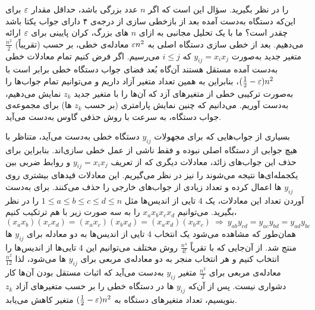را در نظر بگیرید. سؤال این است که اگر 
$n$
عدد بزرگی باشد، حداقل مقدار 
$\varepsilon$
برای این‌که دستگاه به‌دست آمده بعد از بازخطی سازی  از درجه‌ی ۴ دارای جواب یکتا باشد چقدر است؟ ما با یک تحلیل مجانبی به ازای 
$n$
های بزرگ، کران پایینی برای 
$\varepsilon$
ارائه می‌دهیم. بعد از خطی سازی دستگاه اصلی به 
$\varepsilon n^{2}$
معادله‌ی خطی، بر حسب  (تقریباً) 
$\frac{n^{2}}{2}$
متغیر جدید به‌صورت 
$y_{ij} = x_{i}x_{j}$
که 
$i\leq j$
می‌رسیم. اگر فرض کنیم تمام معادلات خطی به‌دست  آمده مستقل هستند آن‌گاه بُعد فضای جواب دستگاه خطی برابر است با 
$(\frac{1}{2} - \varepsilon)n^{2}$، 
بنابراین به همین تعداد متغیر آزاد داریم و می‌توانیم تمام جواب‌ها را به‌صورت ترکیبی خطی از متغیرهای آزد که آن‌ها را با متغیر جدید 
$z_{k}$
نمایش می‌دهیم، به‌دست  آوریم. می‌دانیم که چنین نمایش پارامتری (بر حسب 
$z_{k}$
ها) برای مجموعه‌ی جواب دستگاه، به‌ سرعت با روش حذفی گاوس به‌دست  می‌آید.

بسیاری از جواب‌هایی که برای مجهولات 
$y_{ij}$
دستگاه خطی به‌دست  می‌آید، متناظر با هیچ جوابی از دستگاه اصلی نبوده و فقط ناشی از عمل خطی سازی‌اند. بنابراین برای حذف این جواب‌های زائد، معادلات دیگری که از تعریف 
$y_{ij} = x_{i}x_{j}$
و روابط ضربی بین یکجمله‌ای‌ها نتیجه می‌شوند را نیز در نظر می‌گیریم. این معادلات قیدهای بیشتری روی 
$y_{ij}$
ها اعمال کرده و تعداد زیادی از جواب‌های خارجی را حذف می‌کنند. برای به‌دست  آوردن تعداد این معادلات، یک 
$4$
تایی  از اندیس‌ها مثل 
$1\leq a\leq b\leq c\leq d\leq n$
را در نظر بگیرید. می‌توانیم 
$x_{a}x_{b}x_{c}x_{d}$
را به سه صورت زیر با هم ترتکیب کنیم،
 $$(x_{a}x_{b})(x_{c}x_{d}) = (x_{a}x_{c})(x_{b}x_{d}) = (x_{a}x_{d})(x_{b}x_{c}) \ \Longrightarrow  \ y_{ab}y_{cd} = y_{ac}y_{bd} = y_{ad}y_{bc}$$
 همان‌طور که مشاهده می‌شود یک انتخاب 
 $4$
 تایی از اندیس‌ها به دو معادله برای 
 $y_{ij}$
 ها منتج شد. از آن‌جایی که با تقریاً 
 $\frac{n^{4}}{4!}$
 روش مختلف می‌توانیم این 
 $4$
 تایی‌ها از اندیس‌ها را انتخاب کنیم و هر انتخاب منجر به دو معادله‌ی مربعی برای 
 $y_{ij}$
 ها می‌شود، لذا 
 $\frac{n^{2}}{12}$
معادله‌ی مربعی برای 
$\frac{n^{2}}{2}$
متغیر  
$y_{ij}$
به‌دست  می‌آید که اثبات مستقل بودن آن‌ها کار دشواری نیست. پس از آن‌که 
$y_{ij}$
ها در دستگاه خطی  را بر حسب  متغیرهای آزاد 
$z_{k}$
بنویسیم، تعداد متغیرهای دستگاه به 
$(\frac{1}{2} - \varepsilon)n^{2}$
متغیر کاهش می‌یابد. 

